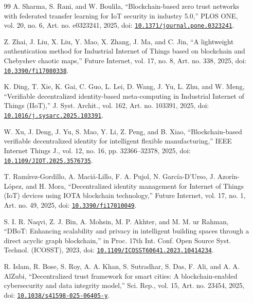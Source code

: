 \documentclass[a4paper,5p,times,twocolumn,number,sort&compress]{elsarticle}
\begin{document}
\begin{thebibliography}{99}
 A. Sharma, S. Rani, and W. Boulila, ``Blockchain-based zero trust networks with federated transfer learning for IoT security in industry 5.0,'' PLOS ONE, vol. 20, no. 6, Art. no. e0323241, 2025, doi: \href{https://doi.org/10.1371/journal.pone.0323241}{\nolinkurl{10.1371/journal.pone.0323241}}.

 Z. Zhai, J. Liu, X. Liu, Y. Mao, X. Zhang, J. Ma, and C. Jin, ``A lightweight authentication method for Industrial Internet of Things based on blockchain and Chebyshev chaotic maps,'' Future Internet, vol. 17, no. 8, Art. no. 338, 2025, doi: \href{https://doi.org/10.3390/fi17080338}{\nolinkurl{10.3390/fi17080338}}.

 K. Ding, T. Xie, K. Gai, C. Guo, L. Lei, D. Wang, J. Yu, L. Zhu, and W. Meng, ``Verifiable decentralized identity-based meta-computing in Industrial Internet of Things (IIoT),'' J. Syst. Archit., vol. 162, Art. no. 103391, 2025, doi: \href{https://doi.org/10.1016/j.sysarc.2025.103391}{\nolinkurl{10.1016/j.sysarc.2025.103391}}.

 W. Xu, J. Deng, J. Yu, S. Mao, Y. Li, Z. Peng, and B. Xiao, ``Blockchain-based verifiable decentralized identity for intelligent flexible manufacturing,'' IEEE Internet Things J., vol. 12, no. 16, pp. 32366--32378, 2025, doi: \href{https://doi.org/10.1109/JIOT.2025.3576735}{\nolinkurl{10.1109/JIOT.2025.3576735}}.

 T. Ram\'irez-Gordillo, A. Maci\'a-Lillo, F. A. Pujol, N. Garc\'ia-D'Urso, J. Azor\'in-L\'opez, and H. Mora, ``Decentralized identity management for Internet of Things (IoT) devices using IOTA blockchain technology,'' Future Internet, vol. 17, no. 1, Art. no. 49, 2025, doi: \href{https://doi.org/10.3390/fi17010049}{\nolinkurl{10.3390/fi17010049}}.

 S. I. R. Naqvi, Z. J. Bin, A. Mohsin, M. P. Akhter, and M. M. ur Rahman, ``DBoT: Enhancing scalability and privacy in intelligent building spaces through a direct acyclic graph blockchain,'' in Proc. 17th Int. Conf. Open Source Syst. Technol. (ICOSST), 2023, doi: \href{https://doi.org/10.1109/ICOSST60641.2023.10414234}{\nolinkurl{10.1109/ICOSST60641.2023.10414234}}.

 R. Islam, R. Bose, S. Roy, A. A. Khan, S. Sutradhar, S. Das, F. Ali, and A. A. AlZubi, ``Decentralized trust framework for smart cities: A blockchain-enabled cybersecurity and data integrity model,'' Sci. Rep., vol. 15, Art. no. 23454, 2025, doi: \href{https://doi.org/10.1038/s41598-025-06405-y}{\nolinkurl{10.1038/s41598-025-06405-y}}.


\end{thebibliography}
\end{document}
